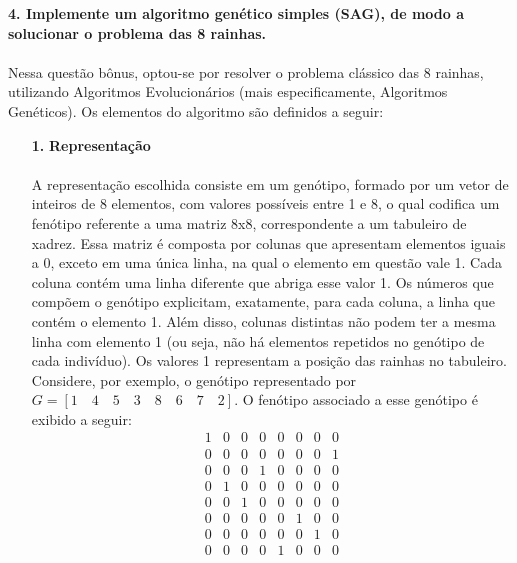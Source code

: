 \documentclass{report}
\begin{document}
	\textbf{4. Implemente um algoritmo genético simples (SAG), de modo a solucionar o problema das 8 rainhas.}\\

	\paragraph{} Nessa questão bônus, optou-se por resolver o problema clássico das 8 rainhas, utilizando Algoritmos Evolucionários (mais especificamente, Algoritmos Genéticos). Os elementos do algoritmo são definidos a seguir:\\
	
	\begin{itemize}
		\item[\textbf{1.}] \textbf{Representação}
		
		\paragraph{} A representação escolhida consiste em um genótipo, formado por um vetor de inteiros de 8 elementos, com valores possíveis entre 1 e 8, o qual codifica um fenótipo referente a uma matriz 8x8, correspondente a um tabuleiro de xadrez. Essa matriz é composta por colunas que apresentam elementos iguais a 0, exceto em uma única linha, na qual o elemento em questão vale 1. Cada coluna contém uma linha diferente que abriga esse valor 1. Os números que compõem o genótipo explicitam, exatamente, para cada coluna, a linha que contém o elemento 1. Além disso, colunas distintas não podem ter a mesma linha com elemento 1 (ou seja, não há elementos repetidos no genótipo de cada indivíduo). Os valores 1 representam a posição das rainhas no tabuleiro. Considere, por exemplo, o genótipo representado por $G = [1 \quad 4 \quad 5 \quad 3 \quad 8 \quad 6 \quad 7 \quad 2]$. O fenótipo associado a esse genótipo é exibido a seguir:\\
		
		\begin{equation*}
		\begin{array}{cccccccc}
		1 & 0 & 0 & 0 & 0 & 0 & 0 & 0 \\ 
		0 & 0 & 0 & 0 & 0 & 0 & 0 & 1 \\ 
		0 & 0 & 0 & 1 & 0 & 0 & 0 & 0 \\ 
		0 & 1 & 0 & 0 & 0 & 0 & 0 & 0 \\ 
		0 & 0 & 1 & 0 & 0 & 0 & 0 & 0 \\ 
		0 & 0 & 0 & 0 & 0 & 1 & 0 & 0 \\ 
		0 & 0 & 0 & 0 & 0 & 0 & 1 & 0 \\ 
		0 & 0 & 0 & 0 & 1 & 0 & 0 & 0
		\end{array} 
		\end{equation*}
		

\end{itemize}
\end{document}
